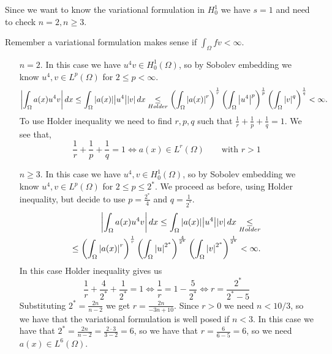     Since we want to know the variational formulation in \(H^1_0\) we have \(s = 1\) and need to check \(n = 2, n \geq 3\). 
    
    Remember a variational formulation makes sense if \(\int_\Omega fv < \infty\).
    \begin{itemize}
        \item[\(n = 2\).] In this case we have \(u^4 v \in H^1_0(\Omega)\), so by Sobolev embedding we know \(u^4, v \in L^p(\Omega)\) for \(2 \leq p < \infty\). 
        \[
            \abs{\int_\Omega a(x) u^4 v}  \, dx \leq \int_\Omega \abs{a(x)} \abs{u^4} \abs{v} \, dx \underset{Holder}{\leq} \left(\int_\Omega \abs{a(x)}^r\right)^{\frac{1}{r}} \left(\int_\Omega \abs{u^4}^p \right)^{\frac{1}{p}} \left(\int_\Omega \abs{v}^q \right)^{\frac{1}{q}} < \infty.
        \]
        To use Holder inequality we need to find \(r, p, q\) such that \(\frac{1}{r} + \frac{1}{p} + \frac{1}{q} = 1\). We see that, 
        \[
            \frac{1}{r} + \frac{1}{p} + \frac{1}{q} = 1 \iff a(x) \in L^r(\Omega) \qquad \text{with } r > 1
        \]
        \item[\(n \geq 3\).] In this case we have \(u^4, v \in H^1_0(\Omega)\), so by Sobolev embedding we know \(u^4, v \in L^p(\Omega)\) for \(2 \leq p \leq 2^*\).
        We proceed as before, using Holder inequality, but decide to use \(p = \frac{2^*}{4}\) and \(q = \frac{1}{2^*}.\)
        \[
            \begin{split}
                \abs{\int_\Omega a(x) u^4 v}  \, dx \leq \int_\Omega \abs{a(x)} \abs{u^4} \abs{v} \, dx \underset{{Holder}}{\leq} \\
                \leq \left(\int_\Omega \abs{a(x)}^r\right)^{\frac{1}{r}} \left(\int_\Omega \abs{u}^{2^*} \right)^{\frac{4}{2^*}} \left(\int_\Omega \abs{v}^{2^*} \right)^{\frac{1}{2^*}} < \infty.
            \end{split}
        \]
        In this case Holder inequality gives us 
        \[
            \frac{1}{r} + \frac{4}{2^*} + \frac{1}{2^*} = 1 \iff \frac{1}{r} = 1 - \frac{5}{2^*} \iff r = \frac{2^*}{2^* - 5}
        \]
        Substituting \(2^* = \frac{2n}{n - 2}\) we get \(r = \frac{2n}{-3n + 10}\). Since \(r > 0\) we need \(n < 10/3\), so we have that the variational formulation is well posed if \(n < 3\).
        In this case we have that \(2^* = \frac{2n}{n - 2} = \frac{2 \cdot 3}{3 - 2} = 6\), so we have that \(r = \frac{6}{6 - 5} = 6\), so we need \(a(x) \in L^6(\Omega)\).
    \end{itemize}
    \newpage
    
